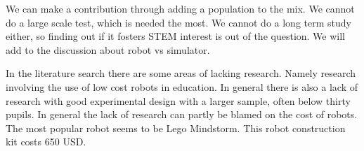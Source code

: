 \bigskip\noindent
We can make a contribution through adding a population to the mix. We cannot do a large scale test, which is needed the most. We cannot do a long term study either, so finding out if it fosters STEM interest is out of the question. We will add to the discussion about robot vs simulator. 

\bigskip\noindent
In the literature search there are some areas of lacking research. Namely research involving the use of low cost robots in education. In general there is also a lack of research with good experimental design with a larger sample, often below thirty pupils. 
In general the lack of research can partly be blamed on the cost of robots. The most popular robot seems to be Lego Mindstorm. This robot construction kit costs 650 USD. 